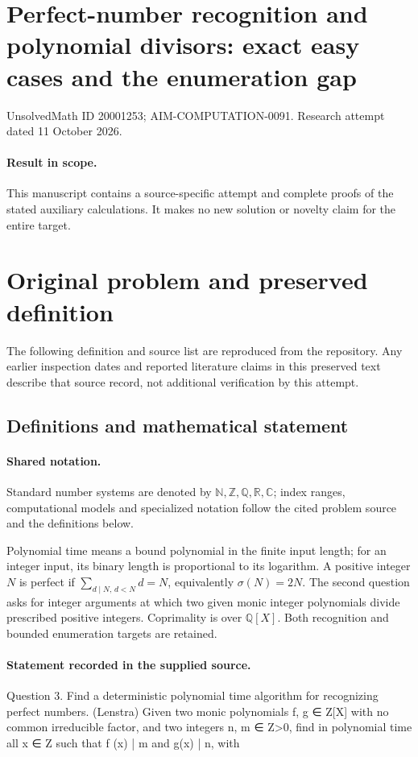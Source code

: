 \documentclass[11pt]{article}
\begin{document}
\section*{Perfect-number recognition and polynomial divisors: exact easy cases and the enumeration gap}
\noindent UnsolvedMath ID 20001253; AIM-COMPUTATION-0091. Research attempt dated 11 October 2026.
\paragraph{Result in scope.}This manuscript contains a source-specific attempt and complete proofs of the stated auxiliary calculations. It makes no new solution or novelty claim for the entire target.
\section{Original problem and preserved definition}
The following definition and source list are reproduced from the repository. Any earlier inspection dates and reported literature claims in this preserved text describe that source record, not additional verification by this attempt.
\subsection{Definitions and mathematical statement}

\paragraph{Shared notation.}Standard number systems are denoted by $\mathbb N,\mathbb Z,\mathbb Q,\mathbb R,\mathbb C$; index ranges, computational models and specialized notation follow the cited problem source and the definitions below.


Polynomial time means a bound polynomial in the finite input length; for an integer input, its binary length is proportional to its logarithm. A positive integer $N$ is perfect if $\sum_{d\mid N,\,d<N}d=N$, equivalently $\sigma(N)=2N$. The second question asks for integer arguments at which two given monic integer polynomials divide prescribed positive integers. Coprimality is over $\mathbb Q[X]$. Both recognition and bounded enumeration targets are retained.
\paragraph{Statement recorded in the supplied source.}
Question 3. Find a deterministic polynomial time algorithm for recognizing perfect numbers. (Lenstra) Given two monic polynomials f, g ∈ Z[X] with no common irreducible factor, and two integers n, m ∈ Z>0, find in polynomial time all x ∈ Z such that f (x) | m and g(x) | n, with
\end{document}
